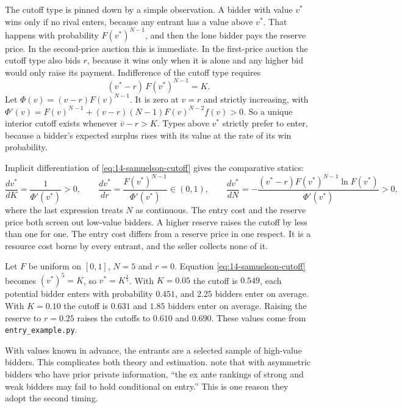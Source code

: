 The cutoff type is pinned down by a simple observation. A bidder with value $v^*$ wins only if no
rival enters, because any entrant has a value above $v^*$. That happens with probability
$F(v^*)^{N-1}$, and then the lone bidder pays the reserve price. In the second-price auction this is
immediate. In the first-price auction the cutoff type also bids $r$, because it wins only when it is
alone and any higher bid would only raise its payment. Indifference of the cutoff type requires
\begin{equation}\label{eq:14-samuelson-cutoff}
(v^*-r)\,F(v^*)^{N-1}=K .
\end{equation}
Let $\Phi(v)=(v-r)F(v)^{N-1}$. It is zero at $v=r$ and strictly increasing, with
$\Phi'(v)=F(v)^{N-1}+(v-r)(N-1)F(v)^{N-2}f(v)>0$. So a unique interior cutoff exists whenever $\bar
v-r>K$. Types above $v^*$ strictly prefer to enter, because a bidder's expected surplus rises with its
value at the rate of its win probability.

Implicit differentiation of \eqref{eq:14-samuelson-cutoff} gives the comparative statics:
\[
\frac{dv^*}{dK}=\frac{1}{\Phi'(v^*)}>0,\qquad
\frac{dv^*}{dr}=\frac{F(v^*)^{N-1}}{\Phi'(v^*)}\in(0,1),\qquad
\frac{dv^*}{dN}=-\frac{(v^*-r)F(v^*)^{N-1}\ln F(v^*)}{\Phi'(v^*)}>0,
\]
where the last expression treats $N$ as continuous. The entry cost and the reserve price both screen
out low-value bidders. A higher reserve raises the cutoff by less than one for one. The entry cost
differs from a reserve price in one respect. It is a resource cost borne by every entrant, and the
seller collects none of it.

\begin{example}\label{ex:14-samuelson}
Let $F$ be uniform on $[0,1]$, $N=5$ and $r=0$. Equation \eqref{eq:14-samuelson-cutoff} becomes
$(v^*)^5=K$, so $v^*=K^{\frac{1}{5}}$. With $K=0.05$ the cutoff is $0.549$, each potential bidder
enters with probability $0.451$, and $2.25$ bidders enter on average. With $K=0.10$ the cutoff is
$0.631$ and $1.85$ bidders enter on average. Raising the reserve to $r=0.25$ raises the cutoffs to
$0.610$ and $0.690$. These values come from \texttt{entry\_example.py}.
\end{example}

With values known in advance, the entrants are a selected sample of high-value bidders. This
complicates both theory and estimation. \citet[Section II.F]{AtheyLevinSeira2011} note that with
asymmetric bidders who have prior private information, ``the ex ante rankings of strong and weak
bidders may fail to hold conditional on entry.'' This is one reason they adopt the second timing.

